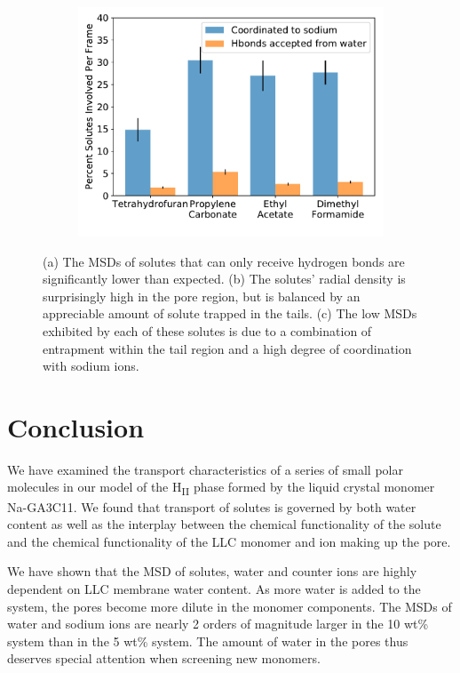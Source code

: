 \documentclass[journal=jpcbfk,manuscript=article]{achemso}
\begin{document}
\begin{figure}[!htb]
\begin{subfigure}{0.325\textwidth}
  \includegraphics[width=\textwidth]{nondonor_hbonds.pdf}
  \caption{}\label{fig:nondonors_hbonds}
  \end{subfigure}
  \caption{(a) The MSDs of solutes that can only receive hydrogen bonds are
  significantly lower than expected. (b) The solutes' radial density
  is surprisingly high in the pore region, but is balanced by an appreciable
  amount of solute trapped in the tails. (c) The low MSDs exhibited by each of these
  solutes is due to a combination of entrapment within the tail region and a high 
  degree of coordination with sodium ions.}\label{fig:nondonors}
  \end{figure}

  \section{Conclusion}

  We have examined the transport characteristics of a series of small polar
  molecules in our model of the H\textsubscript{II} phase formed by the liquid 
  crystal monomer Na-GA3C11. We found that transport of solutes is 
  governed by both water content as well as the interplay between the chemical functionality of the solute
  and the chemical functionality of the LLC monomer and ion making up the pore. 

  We have shown that the MSD of solutes, water and counter ions are highly
  dependent on LLC membrane water content. As more water is added to the system,
  the pores become more dilute in the monomer components. The MSDs of water and
  sodium ions are nearly 2 orders of magnitude larger in the 10 wt\% system than
  in the 5 wt\% system. The amount of water in the pores thus deserves special
  attention when screening new monomers.
  
\end{document}
